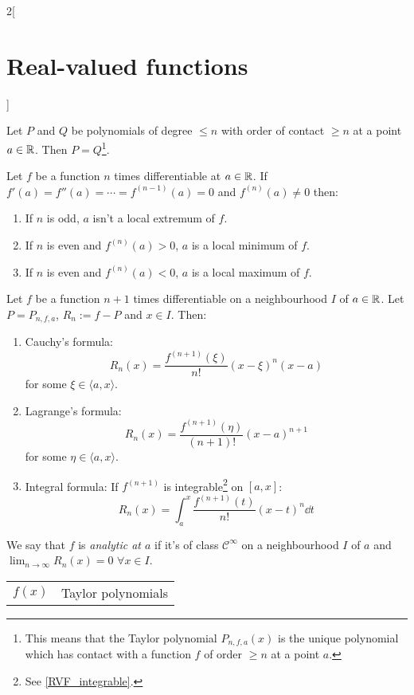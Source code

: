 \documentclass[../../../main.tex]{subfiles}
\begin{document}
\begin{multicols}{2}[\section{Real-valued functions}]
\begin{theorem}
  \end{theorem}
  \begin{prop}
    Let $P$ and $Q$ be polynomials of degree $\leq n$ with order of contact $\geq n$ at a point $a\in\mathbb{R}$. Then $P=Q$\footnote{This means that the Taylor polynomial $P_{n,f,a}(x)$ is the unique polynomial which has contact with a function $f$ of order $\geq n$ at a point $a$.}.
  \end{prop}
  \begin{theorem}
    Let $f$ be a function $n$ times differentiable at $a\in\mathbb{R}$. If $f'(a)=f''(a)=\cdots=f^{(n-1)}(a)=0$ and $f^{(n)}(a)\ne 0$ then:
    \begin{enumerate}
      \item If $n$ is odd, $a$ isn't a local extremum of $f$.
      \item If $n$ is even and $f^{(n)}(a)>0$, $a$ is a local minimum of $f$.
      \item If $n$ is even and $f^{(n)}(a)<0$, $a$ is a local maximum of $f$.
    \end{enumerate}
  \end{theorem}
  \begin{theorem}
    Let $f$ be a function $n+1$ times differentiable on a neighbourhood $I$ of $a\in\mathbb{R}$. Let $P=P_{n,f,a}$, $R_n:=f-P$ and $x\in I$. Then:
    \begin{enumerate}
      \item Cauchy's formula: $$R_n(x)=\frac{f^{(n+1)}(\xi)}{n!}{(x-\xi)}^n(x-a)$$ for some $\xi\in\langle a,x\rangle$.
      \item Lagrange's formula: $$R_n(x)=\frac{f^{(n+1)}(\eta)}{(n+1)!}{(x-a)}^{n+1}$$ for some $\eta\in\langle a,x\rangle$.
      \item Integral formula: If $f^{(n+1)}$ is integrable\footnote{See \cref{RVF_integrable}.} on $[a,x]$: $$R_n(x)=\int_a^x\frac{f^{(n+1)}(t)}{n!}{(x-t)}^n\dd t$$
    \end{enumerate}
  \end{theorem}
  \begin{definition}
    We say that $f$ is \textit{analytic at $a$} if it's of class $\mathcal{C}^\infty$ on a neighbourhood $I$ of $a$ and $\displaystyle\lim_{n\to\infty}R_n(x)=0$  $\forall x\in I$.
  \end{definition}
  \begin{center}
    \renewcommand*{\arraystretch}{2}
    \begin{tabular}{|c|>{\centering\arraybackslash}m{6.5cm}|}
      \hline
      $f(x)$                       & Taylor polynomials                                                                                     \\

\end{tabular}
\end{center}
\end{multicols}
\end{document}
